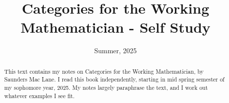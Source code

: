 \documentclass[11pt, letterpaper]{report}
\title{Categories for the Working Mathematician - Self Study}
\date{Summer, 2025}
\begin{document}
\maketitle
\begin{abstract}
	This text contains my notes on Categories for the Working Mathematician, by Saunders Mac Lane. I read this book independently, starting in mid spring semester of my sophomore year, 2025. My notes largely paraphrase the text, and I work out whatever examples I see fit.
\end{abstract}
\tableofcontents













\end{document}
